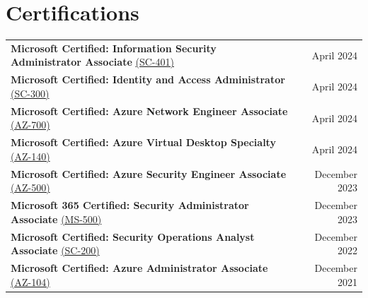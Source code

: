 \documentclass[11pt, letterpaper]{article}
\begin{document}
\section{Certifications}
\begin{itemize}[leftmargin=0.15in, label={}]
    \small{\item{
    \begin{tabular*}{0.97\textwidth}{l@{\extracolsep{\fill}}r}
      \textbf{\color{darktext}Microsoft Certified: Information Security Administrator Associate} \href{https://learn.microsoft.com/api/credentials/share/en-in/ChinmayDhokMAQSoftware-5822/175A9EF2AB5B5B56?sharingId=BC2982D57159EF1A}{\color{graytext}(SC-401)} & \color{lightgray}April 2024 \\
      \textbf{\color{darktext}Microsoft Certified: Identity and Access Administrator} \href{https://learn.microsoft.com/en-us/users/chinmaydhokmaqsoftware-5822/credentials/82be0c3d23d052b8}{\color{graytext}(SC-300)} & \color{lightgray}April 2024 \\
      \textbf{\color{darktext}Microsoft Certified: Azure Network Engineer Associate} \href{https://learn.microsoft.com/en-us/users/ChinmayDhokMAQSoftware-5822/credentials/4244163FEBBEDDAF}{\color{graytext}(AZ-700)} & \color{lightgray}April 2024 \\
      \textbf{\color{darktext}Microsoft Certified: Azure Virtual Desktop Specialty} \href{https://learn.microsoft.com/en-us/users/chinmaydhokmaqsoftware-5822/credentials/ccf1857230b93a53}{\color{graytext}(AZ-140)} & \color{lightgray}April 2024 \\
      \textbf{\color{darktext}Microsoft Certified: Azure Security Engineer Associate} \href{https://learn.microsoft.com/en-us/users/ChinmayDhokMAQSoftware-5822/credentials/AB3913F87040CE9}{\color{graytext}(AZ-500)} & \color{lightgray}December 2023 \\
      \textbf{\color{darktext}Microsoft 365 Certified: Security Administrator Associate} \href{https://learn.microsoft.com/en-us/users/chinmaydhokmaqsoftware-5822/credentials/c0ae1a2902b51750}{\color{graytext}(MS-500)} & \color{lightgray}December 2023 \\
      \textbf{\color{darktext}Microsoft Certified: Security Operations Analyst Associate} \href{https://learn.microsoft.com/en-us/users/ChinmayDhokMAQSoftware-5822/credentials/E22E4108C28D9FF2}{\color{graytext}(SC-200)} & \color{lightgray}December 2022 \\
      \textbf{\color{darktext}Microsoft Certified: Azure Administrator Associate} \href{https://learn.microsoft.com/en-us/users/chinmaydhokmaqsoftware-5822/credentials/ccf1857230b93a53}{\color{graytext}(AZ-104)} & \color{lightgray}December 2021 \\
    \end{tabular*}
    }}
\end{itemize}
\end{document}
